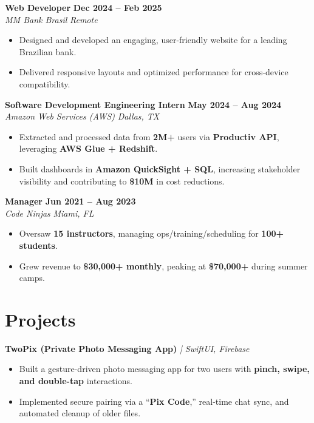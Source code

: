 \documentclass[8pt]{resume}
\begin{document}
\textbf{Web Developer} \hfill \textbf{Dec 2024 – Feb 2025}\\
\textit{MM Bank Brasil} \hfill \textit{Remote}
\begin{itemize}
    \item Designed and developed an engaging, user-friendly website for a leading Brazilian bank.
    \item Delivered responsive layouts and optimized performance for cross-device compatibility.
\end{itemize}

\textbf{Software Development Engineering Intern} \hfill \textbf{May 2024 – Aug 2024}\\
\textit{Amazon Web Services (AWS)} \hfill \textit{Dallas, TX}
\begin{itemize}
    \item Extracted and processed data from \textbf{2M+} users via \textbf{Productiv API}, leveraging \textbf{AWS Glue + Redshift}.
    \item Built dashboards in \textbf{Amazon QuickSight + SQL}, increasing stakeholder visibility and contributing to \textbf{\$10M} in cost reductions.    
\end{itemize}

\textbf{Manager} \hfill \textbf{Jun 2021 – Aug 2023}\\
\textit{Code Ninjas} \hfill \textit{Miami, FL}
\begin{itemize}
    \item Oversaw \textbf{15 instructors}, managing ops/training/scheduling for \textbf{100+ students}.
    \item Grew revenue to \textbf{\$30,000+ monthly}, peaking at \textbf{\$70,000+} during summer camps.
\end{itemize}

\section{Projects}

\textbf{TwoPix (Private Photo Messaging App)} \textit{| SwiftUI, Firebase}
\begin{itemize}
    \item Built a gesture-driven photo messaging app for two users with \textbf{pinch, swipe, and double-tap} interactions.
    \item Implemented secure pairing via a “\textbf{Pix Code},” real-time chat sync, and automated cleanup of older files.
\end{itemize}
\end{document}
